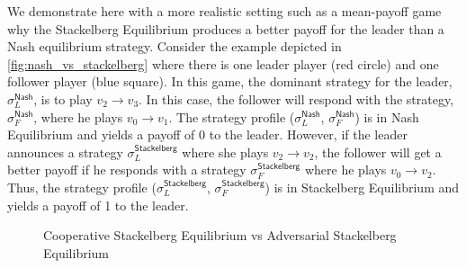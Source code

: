 We demonstrate here with a more realistic setting such as a mean-payoff game why the Stackelberg Equilibrium produces a better payoff for the leader than a Nash equilibrium strategy. Consider the example depicted in \cref{fig:nash_vs_stackelberg} where there is one leader player (red circle) and one follower player (blue square). In this game, the dominant strategy for the leader, $\sigma_L^{\mathsf{Nash}}$, is to play $v_2 \to v_3$. In this case, the follower will respond with the strategy, $\sigma_F^{\mathsf{Nash}}$, where he plays $v_0 \to v_1$. The strategy profile ($\sigma_L^{\mathsf{Nash}}$, $\sigma_F^{\mathsf{Nash}}$) is in Nash Equilibrium and yields a payoff of 0 to the leader. However, if the leader announces a strategy $\sigma_L^{\mathsf{Stackelberg}}$ where she plays $v_2 \to v_2$, the follower will get a better payoff if he responds with a strategy $\sigma_F^{\mathsf{Stackelberg}}$ where he plays $v_0 \to v_2$. Thus, the strategy profile ($\sigma_L^{\mathsf{Stackelberg}}$, $\sigma_F^{\mathsf{Stackelberg}}$) is in Stackelberg Equilibrium and yields a payoff of 1 to the leader.

\begin{figure}
    \centering
    \caption{Cooperative Stackelberg Equilibrium vs Adversarial Stackelberg Equilibrium}
    \label{fig:cooperative_vs_adversarial}
\end{figure}

